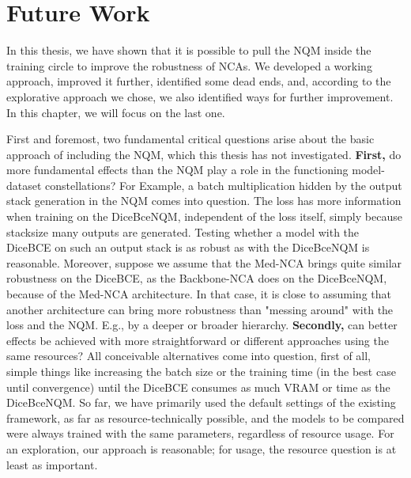\chapter{Future Work}
\label{future_work}
In this thesis, we have shown that it is possible to pull the NQM inside the training circle to improve the robustness of NCAs. We developed a working approach, improved it further, identified some dead ends, and, according to the explorative approach we chose, we also identified ways for further improvement. In this chapter, we will focus on the last one.


First and foremost, two fundamental critical questions arise about the basic approach of including the NQM, which this thesis has not investigated.
\textbf{First,} do more fundamental effects than the NQM play a role in the functioning model-dataset constellations? For Example, a batch multiplication hidden by the output stack generation in the NQM comes into question. The loss has more information when training on the DiceBceNQM, independent of the loss itself, simply because stacksize many outputs are generated. Testing whether a model with the DiceBCE on such an output stack is as robust as with the DiceBceNQM is reasonable.
Moreover, suppose we assume that the Med-NCA brings quite similar robustness on the DiceBCE, as the Backbone-NCA does on the DiceBceNQM, because of the Med-NCA architecture. In that case, it is close to assuming that another architecture can bring more robustness than "messing around" with the loss and the NQM. E.g., by a deeper or broader hierarchy.
\textbf{Secondly,} can better effects be achieved with more straightforward or different approaches using the same resources? All conceivable alternatives come into question, first of all, simple things like increasing the batch size or the training time (in the best case until convergence) until the DiceBCE consumes as much VRAM or time as the DiceBceNQM. So far, we have primarily used the default settings of the existing framework, as far as resource-technically possible, and the models to be compared were always trained with the same parameters, regardless of resource usage. For an exploration, our approach is reasonable; for usage, the resource question is at least as important.


